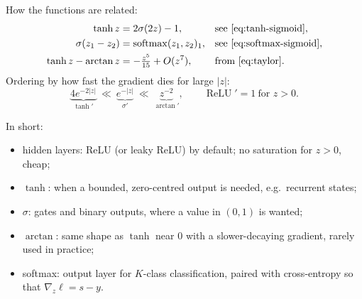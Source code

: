 \documentclass[11pt]{article}
\begin{document}
How the functions are related:
\begin{align}
  \tanh z &= 2\sigma(2z)-1, &&\text{see \eqref{eq:tanh-sigmoid}},\\
  \sigma(z_1-z_2) &= \operatorname{softmax}(z_1,z_2)_1, &&\text{see \eqref{eq:softmax-sigmoid}},\\
  \tanh z-\arctan z &= -\tfrac{z^5}{15}+O(z^7), &&\text{from \eqref{eq:taylor}}.
\end{align}
Ordering by how fast the gradient dies for large $|z|$:
\begin{equation}
  \underbrace{4e^{-2|z|}}_{\tanh'}\ \ll\ \underbrace{e^{-|z|}}_{\sigma'}\ \ll\ \underbrace{z^{-2}}_{\arctan'},
  \qquad \operatorname{ReLU}'=1 \ \text{for } z>0 .
\end{equation}

In short:
\begin{itemize}
  \item hidden layers: ReLU (or leaky ReLU) by default; no saturation for $z>0$, cheap;
  \item $\tanh$: when a bounded, zero-centred output is needed, e.g.\ recurrent states;
  \item $\sigma$: gates and binary outputs, where a value in $(0,1)$ is wanted;
  \item $\arctan$: same shape as $\tanh$ near $0$ with a slower-decaying gradient, rarely used in practice;
  \item softmax: output layer for $K$-class classification, paired with cross-entropy so that $\nabla_z\ell=s-y$.
\end{itemize}
\end{document}
